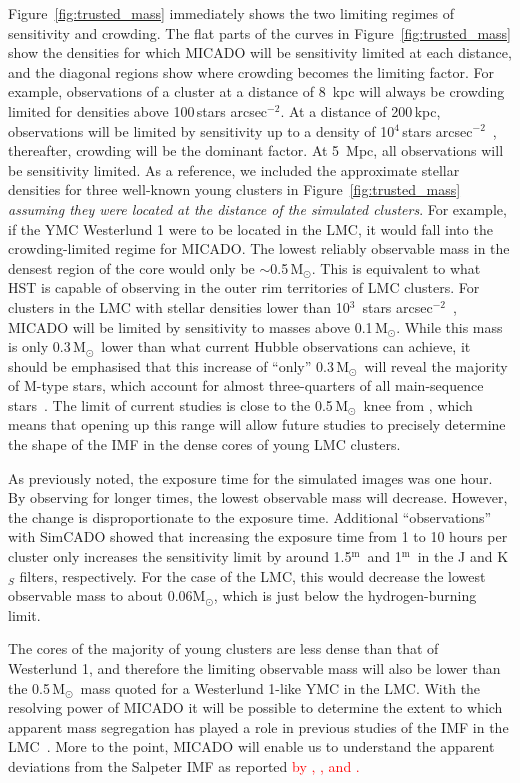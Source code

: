 \documentclass{aa}
\newcommand{\m}{$^\mathrm{m}$~}
\newcommand{\msun}{M$_\odot$~}
\newcommand{\msune}{M$_\odot$}
\newcommand{\s}{$\sim$}
\newcommand{\h}[1]{$^{#1}$}
\newcommand{\spa}{stars arcsec$^{-2}$~}
\newcommand{\spae}{stars arcsec$^{-2}$}
\newcommand{\langedit}[1]{\textcolor{red}{#1}}
\begin{document}
Figure~\ref{fig:trusted_mass} immediately shows the two limiting regimes of sensitivity and crowding.
The flat parts of the curves in Figure~\ref{fig:trusted_mass} show the densities for which MICADO will be sensitivity limited at each distance, and the diagonal regions show where crowding becomes the limiting factor.
For example, observations of a cluster at a distance of 8\, kpc will always be crowding limited for densities above 100\,\spae.
At a distance of 200\,kpc, observations will be limited by sensitivity up to a density of 10\h4\,\spa, thereafter, crowding will be the dominant factor.
At 5\, Mpc, all observations will be sensitivity limited.
As a reference, we included the approximate stellar densities for three well-known young clusters in Figure~\ref{fig:trusted_mass} \textit{\textup{assuming they were located at the distance of the simulated clusters}}.
For example, if the YMC Westerlund 1 were to be located in the LMC, it would fall into the crowding-limited regime for MICADO\@.
The lowest reliably observable mass in the densest region of the core would only be \s0.5\,\msune.
This is equivalent to what HST is capable of observing in the outer rim territories of LMC clusters.
For clusters in the LMC with stellar densities lower than 10\h3~\spa , MICADO will be limited by sensitivity to masses above 0.1\,\msune.
While this mass is only 0.3\,\msun lower than what current Hubble observations can achieve, it should be emphasised that this increase of ``only'' 0.3\,\msun will reveal the majority of M-type stars, which account for almost three-quarters of all main-sequence stars~\citep{ledrew2001}.
The limit of current studies is close to the 0.5\,\msun knee from \citet{kroupa2001}, which means that opening up this range will allow future studies to precisely determine the shape of the IMF in the dense cores of young LMC clusters.

As previously noted, the exposure time for the simulated images was one hour.
By observing for longer times, the lowest observable mass will decrease.
However, the change is disproportionate to the exposure time.
Additional ``observations'' with SimCADO showed that increasing the exposure time from 1 to 10 hours per cluster only increases the sensitivity limit by around 1.5\m and 1\m in the J and K$_S$ filters, respectively.
For the case of the LMC, this would decrease the lowest observable mass to about 0.06\msune, which is just below the hydrogen-burning limit.

The cores of the majority of young clusters are less dense than that of Westerlund 1, and therefore the limiting observable mass will also be lower than the 0.5\,\msun mass quoted for a Westerlund 1-like YMC in the LMC\@.
With the resolving power of MICADO it will be possible to determine the extent to which apparent mass segregation has played a role in previous studies of the IMF in the LMC~\citep{Ascenso2009-de}.
More to the point, MICADO will enable us to understand the apparent deviations from the Salpeter IMF as reported \langedit{by \citet{dario2009}, \citet{geha2013}, and \citet{kalirai2013}.}
\end{document}
